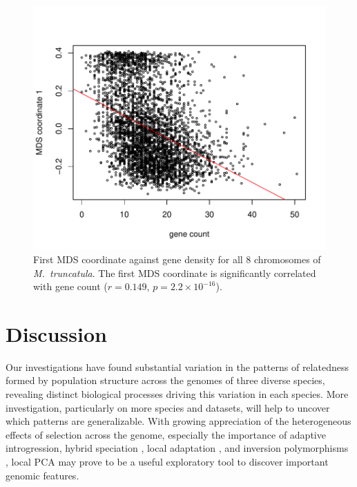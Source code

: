 \documentclass[11pt, oneside]{article}   	%
\begin{document}
\begin{figure}
    \begin{center}
       \includegraphics{MDS_1D_against_gene_count_all_chr_win104_with_lm_update}
    \end{center}
    \caption{
        First MDS coordinate against gene density for all 8 chromosomes of \textit{M.~truncatula}.
        The first MDS coordinate is significantly correlated with gene count ($r=0.149$, $p=2.2\times 10^{-16}$). 
        \label{fig:mds_gene_count}
    }
\end{figure}

\section{Discussion}

Our investigations have found substantial variation in the patterns of relatedness formed by population structure across the genomes
of three diverse species,
revealing distinct biological processes driving this variation in each species.
More investigation, particularly on more species and datasets, will help to uncover which patterns are generalizable.
With growing appreciation of the heterogeneous effects of selection across the genome,
especially the importance of adaptive introgression, hybrid speciation \citep{pool2015natural,brandvain2014speciation,hufford2013genomic,fitzpatrick2010rapid,staubach2012genome},
local adaptation \citep{lenormand2002limits,wang2014isolation},
and inversion polymorphisms \citep{kirkpatrick2015chromosome,kirkpatrick2010chromosome},
local PCA may prove to be a useful exploratory tool to discover important genomic features.
\end{document}
